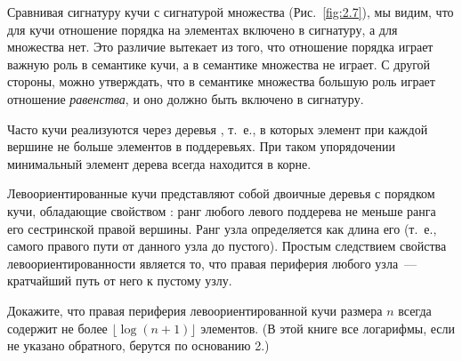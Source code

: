 \begin{remark}
  Сравнивая сигнатуру кучи с сигнатурой множества
  (Рис.~\ref{fig:2.7}), мы видим, что для кучи отношение порядка на
  элементах включено в сигнатуру, а для множества нет.  Это различие
  вытекает из того, что отношение порядка играет важную роль в
  семантике кучи, а в семантике множества не играет.  С другой
  стороны, можно утверждать, что в семантике множества большую роль
  играет отношение \emph{равенства}, и оно должно быть включено в
  сигнатуру.
\end{remark}

Часто кучи реализуются через деревья , т.~е., в которых элемент при каждой вершине не
больше элементов в поддеревьях. При таком упорядочении минимальный
элемент дерева всегда находится в корне.

Левоориентированные кучи \cite{Crane1972, Knuth1973a} представляют
собой двоичные деревья с порядком кучи, обладающие свойством
: ранг любого левого поддерева
не меньше ранга его сестринской правой вершины.  Ранг узла
определяется как длина его 
(т.~е., самого правого пути от данного узла до пустого).  Простым
следствием свойства левоориентированности является то, что правая
периферия любого узла~--- кратчайший путь от него к пустому узлу.

\begin{exercise}\label{ex:3.1}
  Докажите, что правая периферия левоориентированной кучи размера $n$
  всегда содержит не более $\lfloor \log(n+1) \rfloor$ элементов. (В
  этой книге все логарифмы, если не указано обратного, берутся по
  основанию 2.)
\end{exercise}

